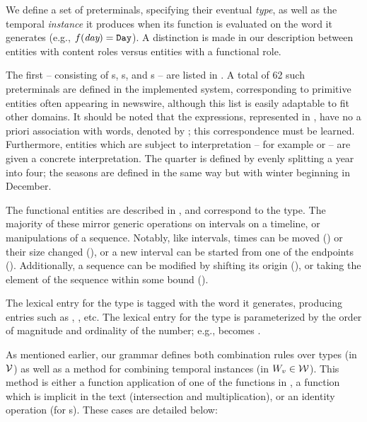 We define a set of preterminals, specifying their eventual
	\textit{type}, as well as the temporal \textit{instance} it
	produces when its function is evaluated on the word it generates
	(e.g., $f(\textit{day}) = \texttt{Day}$).
A distinction is made in our description between entities with 
	content roles versus entities with a functional role.

The first -- consisting of s, s, and s --
	are listed in .
A total of 62 such preterminals are defined in the implemented system,
	corresponding to primitive entities often appearing in newswire,
	although this list is easily adaptable to fit other domains.
It should be noted that the expressions, represented in ,
	have no a priori association with words, denoted by ;
	this correspondence must be learned.
Furthermore, entities which are subject to interpretation -- for example
	 or  -- are given a concrete interpretation.
The  quarter is defined by evenly splitting a year into four;
	the seasons are defined in the same way but with winter beginning in December.

The functional entities are described in , and correspond to
	the  type.
The majority of these mirror generic operations on intervals on a timeline,
	or manipulations of a sequence.
Notably, like intervals, times can be moved () or
	their size changed (), or
	a new interval can be started from one of the endpoints
	().
Additionally, a sequence can be modified by shifting its origin
	(), 
	or taking the  element of the sequence within some bound
	().

The lexical entry for the  type is tagged with the word it
	generates, producing entries such as , , etc.
The lexical entry for the  type is parameterized by
	the order of magnitude and ordinality of the number; e.g.,
	 becomes .


As mentioned earlier, our grammar defines both combination rules
	over types (in $\mathcal{V}$) as well as a method for combining temporal
	instances (in $W_v \in \mathcal{W}$).
This method is either a function application of one of the functions in
	, a function which is implicit in the text
	(intersection and multiplication), or an identity operation (for s).
These cases are detailed below:

